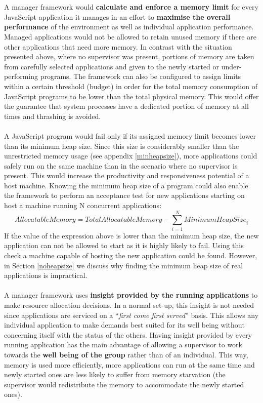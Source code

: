 \documentclass{l4proj}
\begin{document}
\\\\
\hspace*{1em} A manager framework would \textbf{calculate and enforce a memory limit} for every JavaScript application it manages in an effort to \textbf{maximise the overall performance} of the environment as well as individual application performance. Managed applications would not be allowed to retain unused memory if there are other applications that need more memory. In contrast with the situation presented above, where no supervisor was present, portions of memory are taken from carefully selected applications and given to the newly started or under-performing programs. The framework can also be configured to assign limits within a certain threshold (budget) in order for the total memory consumption of JavaScript programs to be lower than the total physical memory. This would offer the guarantee that system processes have a dedicated portion of memory at all times and thrashing is avoided.
\\\\
\hspace*{1em} A JavaScript program would fail only if its assigned memory limit becomes lower than its minimum heap size. Since this size is considerably smaller than the unrestricted memory usage (see appendix \ref{minheapsize}), more applications could safely run on the same machine than in the scenario where no supervisor is present. This would increase the productivity and responsiveness potential of a host machine. Knowing the minimum heap size of a program could also enable the framework to perform an acceptance test for new applications starting on host a machine running N concurrent applications:
\begin{equation} 
\textit{AllocatableMemory} = \textit{TotalAllocatableMemory} - \sum_{i=1}^{N}\textit{MinimumHeapSize}_i
\end{equation}
If the value of the expression above is lower than the minimum heap size, the new application can not be allowed to start as it is highly likely to fail. Using this check a machine capable of hosting the new application could be found. However, in Section \ref{noheapsize} we discuss why finding the minimum heap size of real applications is impractical. 
\\\\
\hspace*{1em} A manager framework uses \textbf{insight provided by the running applications} to make resource allocation decisions. In a normal set-up, this insight is not needed since applications are serviced on a ``\textit{first come first served}'' basis. This allows any individual application to make demands best suited for its well being without concerning itself with the status of the others. Having insight provided by every running application has the main advantage of allowing a supervisor to work towards the \textbf{well being of the group} rather than of an individual. This way, memory is used more efficiently, more applications can run at the same time and newly started ones are less likely to suffer from memory starvation (the supervisor would redistribute the memory to accommodate the newly started ones).
\end{document}
